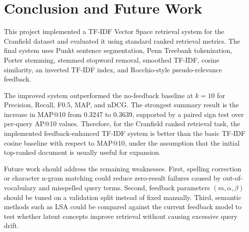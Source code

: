 \section{Conclusion and Future Work}\label{sec:conclusion}

This project implemented a TF-IDF Vector Space retrieval system for the
Cranfield dataset and evaluated it using standard ranked retrieval metrics. The
final system uses Punkt sentence segmentation, Penn Treebank tokenization,
Porter stemming, stemmed stopword removal, smoothed TF-IDF, cosine similarity,
an inverted TF-IDF index, and Rocchio-style pseudo-relevance feedback.

The improved system outperformed the no-feedback baseline at $k=10$ for
Precision, Recall, F0.5, MAP, and nDCG. The strongest summary result is the
increase in MAP@10 from 0.3247 to 0.3639, supported by a paired sign test over
per-query AP@10 values. Therefore, for the Cranfield ranked retrieval task, the
implemented feedback-enhanced TF-IDF system is better than the basic TF-IDF
cosine baseline with respect to MAP@10, under the assumption that the initial
top-ranked document is usually useful for expansion.

Future work should address the remaining weaknesses. First, spelling correction
or character n-gram matching could reduce zero-result failures caused by
out-of-vocabulary and misspelled query terms. Second, feedback parameters
$(m,\alpha,\beta)$ should be tuned on a validation split instead of fixed
manually. Third, semantic methods such as LSA could be compared against the
current feedback model to test whether latent concepts improve retrieval without
causing excessive query drift.
